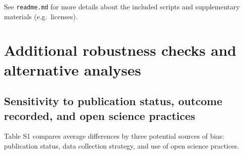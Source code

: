 \documentclass[sn-nature,referee,lineno,pdflatex]{sn-jnl}
\begin{document}
See \texttt{readme.md} for more details about the included scripts and
supplementary materials (e.g.~licenses).

\section{Additional robustness checks and alternative
analyses}\label{additional-robustness-checks-and-alternative-analyses}

\subsection{Sensitivity to publication status, outcome recorded, and
open science
practices}\label{sensitivity-to-publication-status-outcome-recorded-and-open-science-practices}

Table S1 compares average differences by three potential sources of
bias: publication status, data collection strategy, and use of open
science practices.
\end{document}
